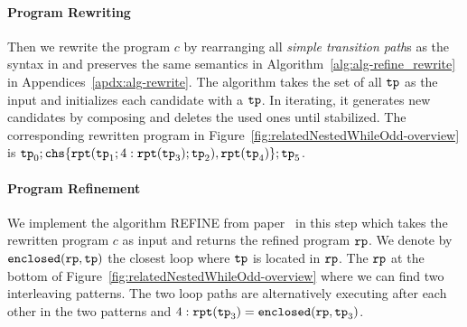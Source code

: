 \paragraph{Program Rewriting}
Then we rewrite the program $c$ by rearranging all \emph{simple transition path}s as the syntax in \cite{GulwaniJK09} and preserves the same semantics in Algorithm~\ref{alg:alg-refine_rewrite} in Appendices~\ref{apdx:alg-rewrite}.
The algorithm takes the set of all $\mathtt{tp}$ as the input and initializes each candidate with a
$\mathtt{tp}$.
In iterating, it generates new candidates by composing and deletes the used ones until stabilized.
%
The corresponding rewritten program in Figure~\ref{fig:relatedNestedWhileOdd-overview} is
$ 
\tpath_0; \rpchoose{\rprepeat(\tpath_1; 4:\rprepeat(\tpath_3); \tpath_2),\rprepeat(\tpath_4) }; \tpath_5
$.

\paragraph{Program Refinement}
We implement the algorithm REFINE from paper~\cite{GulwaniJK09} in this step which takes the rewritten program $c$ as input and returns the
refined program $\mathtt{rp}$. We denote by $\mathtt{enclosed}(\mathtt{rp}, \mathtt{tp})$ the closest loop where $\mathtt{tp}$ is located in $\mathtt{rp}$.
The $\mathtt{rp}$ at the bottom of Figure~\ref{fig:relatedNestedWhileOdd-overview} where we can find two interleaving patterns.
The two loop paths are alternatively executing after each other in the two patterns and
 $4:\mathtt{rpt}(\mathtt{tp}_3) = \mathtt{enclosed}(\mathtt{rp}, \mathtt{tp}_3)$.

